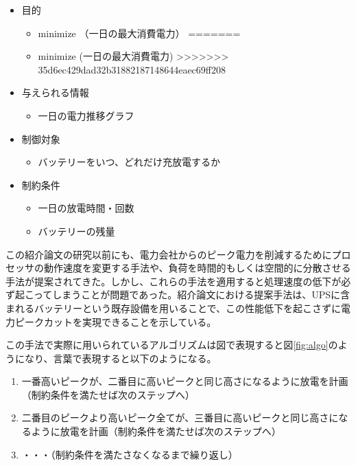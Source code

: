 \begin{itemize}
  \item 目的
    \begin{itemize}
<<<<<<< HEAD
      \item minimize （一日の最大消費電力）
=======
      \item minimize (一日の最大消費電力)
>>>>>>> 35d6ec429dad32b31882187148644eaec69ff208
    \end{itemize}
  \item 与えられる情報
    \begin{itemize}
      \item 一日の電力推移グラフ
    \end{itemize}
  \item 制御対象
    \begin{itemize}
      \item バッテリーをいつ、どれだけ充放電するか
    \end{itemize}
  \item 制約条件
    \begin{itemize}
      \item 一日の放電時間・回数
      \item バッテリーの残量
    \end{itemize}
\end{itemize}

この紹介論文の研究以前にも、電力会社からのピーク電力を削減するためにプロセッサの動作速度を変更する手法\cite{Chen:2005:MSE:1064212.1064253,Isci:2006:AEM:1194816.1194850,Raghavendra:2008:NPS:1353534.1346289,4658632,4658631}や、負荷を時間的もしくは空間的に分散させる手法\cite{Unleash,Moore:2005:MSC:1247360.1247365}が提案されてきた。しかし、これらの手法を適用すると処理速度の低下が必ず起こってしまうことが問題であった。紹介論文における提案手法は、UPSに含まれるバッテリーという既存設備を用いることで、この性能低下を起こさずに電力ピークカットを実現できることを示している。

この手法で実際に用いられているアルゴリズムは図で表現すると図\ref{fig:algo}のようになり、言葉で表現すると以下のようになる。

\begin{enumerate}
<<<<<<< HEAD
  \item 一番高いピークが、二番目に高いピークと同じ高さになるように放電を計画（制約条件を満たせば次のステップへ）
  \item 二番目のピークより高いピーク全てが、三番目に高いピークと同じ高さになるように放電を計画（制約条件を満たせば次のステップへ）
  \item ・・・（制約条件を満たさなくなるまで繰り返し）
\end{enumerate}

